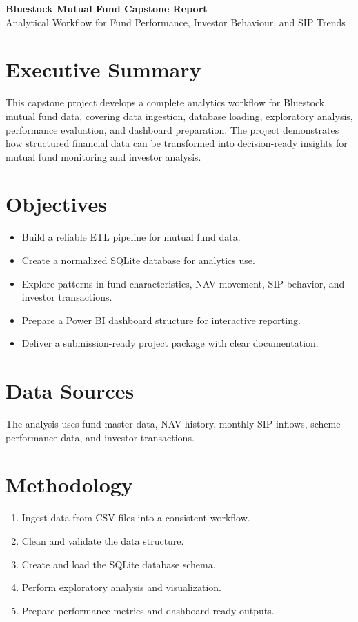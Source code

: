 \documentclass[11pt]{article}
\begin{document}
\begin{center}
{\Large \textbf{Bluestock Mutual Fund Capstone Report}}\\[0.5em]
{\large Analytical Workflow for Fund Performance, Investor Behaviour, and SIP Trends}
\end{center}
\vspace{1em}
\section{Executive Summary}
This capstone project develops a complete analytics workflow for Bluestock mutual fund data, covering data ingestion, database loading, exploratory analysis, performance evaluation, and dashboard preparation. The project demonstrates how structured financial data can be transformed into decision-ready insights for mutual fund monitoring and investor analysis.

\section{Objectives}
\begin{itemize}[leftmargin=1.5em]
\item Build a reliable ETL pipeline for mutual fund data.
\item Create a normalized SQLite database for analytics use.
\item Explore patterns in fund characteristics, NAV movement, SIP behavior, and investor transactions.
\item Prepare a Power BI dashboard structure for interactive reporting.
\item Deliver a submission-ready project package with clear documentation.
\end{itemize}

\section{Data Sources}
The analysis uses fund master data, NAV history, monthly SIP inflows, scheme performance data, and investor transactions.

\section{Methodology}
\begin{enumerate}[leftmargin=1.5em]
\item Ingest data from CSV files into a consistent workflow.
\item Clean and validate the data structure.
\item Create and load the SQLite database schema.
\item Perform exploratory analysis and visualization.
\item Prepare performance metrics and dashboard-ready outputs.
\end{enumerate}
\end{document}
